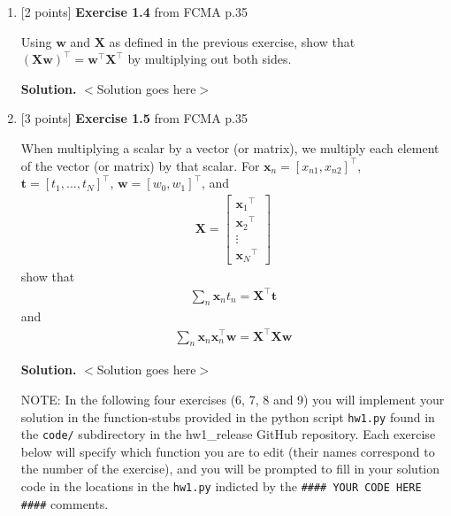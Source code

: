 \documentclass[10pt]{article}
\begin{document}
\begin{enumerate}
{\bf Solution.} $<$Solution goes here$>$\\



\item \label{prob:4} [2 points]
{\bf Exercise 1.4} from FCMA p.35

Using $\mathbf{w}$ and $\mathbf{X}$ as defined in the previous exercise, show that ${(\mathbf{X}\mathbf{w})}^\top = {\mathbf{w}}^\top{\mathbf{X}}^\top$ by multiplying out both sides.

{\bf Solution.} $<$Solution goes here$>$\\



\item \label{prob:5} [3 points]
{\bf Exercise 1.5} from FCMA p.35  %

When multiplying a scalar by a vector (or matrix), we multiply each element of the vector (or matrix) by that scalar.  For $\mathbf{x}_n = {[ x_{n1}, x_{n2} ]}^\top$, $\mathbf{t} = {[ t_1,...,t_N ]}^\top$, $\mathbf{w} = {[ w_0, w_1 ]}^\top$, and
\begin{eqnarray*}
\mathbf{X} = 
    \begin{bmatrix}
    {\mathbf{x}_{1}}^\top \\[0.3em]
    {\mathbf{x}_{2}}^\top \\[0.3em]
    \vdots \\[0.3em]
    {\mathbf{x}_{N}}^\top
    \end{bmatrix}
\end{eqnarray*}
show that
\begin{eqnarray*}
\sum_{n} \mathbf{x}_n t_n = \mathbf{X}^\top\mathbf{t}
\end{eqnarray*}
and
\begin{eqnarray*}
\sum_{n} \mathbf{x}_n \mathbf{x}_n ^\top \mathbf{w} = \mathbf{X}^\top\mathbf{X} \mathbf{w}
\end{eqnarray*}

{\bf Solution.} $<$Solution goes here$>$\\



\newpage

NOTE: In the following four exercises (6, 7, 8 and 9) you will implement your solution in the function-stubs provided in the python script {\tt hw1.py} found in the {\tt code/} subdirectory in the {hw1\_release} GitHub repository. Each exercise below will specify which function you are to edit (their names correspond to the number of the exercise), and you will be prompted to fill in your solution code in the locations in the {\tt hw1.py} indicted by the {\tt \#\#\#\# YOUR CODE HERE \#\#\#\#} comments. 


\end{enumerate}
\end{document}
